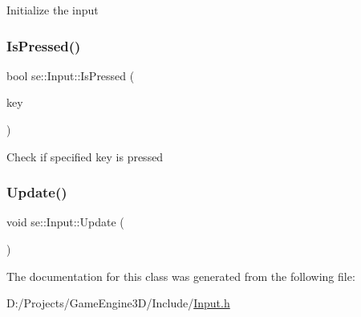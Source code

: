 Initialize the input \mbox{\label{classse_1_1_input_a7f63b679d5f26fd7022be7028218a3da}} 
\subsubsection{\texorpdfstring{Is\+Pressed()}{IsPressed()}}
{\footnotesize\ttfamily bool se\+::\+Input\+::\+Is\+Pressed (\begin{DoxyParamCaption}\item[{B\+Y\+TE}]{key }\end{DoxyParamCaption})}

Check if specified key is pressed \mbox{\label{classse_1_1_input_a823406d60664b299791026e869abe121}} 
\subsubsection{\texorpdfstring{Update()}{Update()}}
{\footnotesize\ttfamily void se\+::\+Input\+::\+Update (\begin{DoxyParamCaption}{ }\end{DoxyParamCaption})}



The documentation for this class was generated from the following file\+:\begin{DoxyCompactItemize}
\item 
D\+:/\+Projects/\+Game\+Engine3\+D/\+Include/\mbox{\hyperlink{_input_8h}{Input.\+h}}\end{DoxyCompactItemize}
